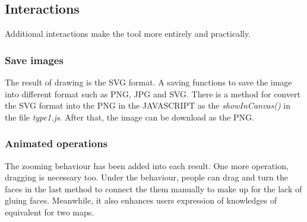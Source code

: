 \subsection{Interactions}

Additional interactions make the tool more entirely and practically.

\subsubsection{Save images}
The result of drawing is the SVG format. A saving functions to save the image into different format such as PNG, JPG and SVG. There is a method for convert the SVG format into the PNG in the JAVASCRIPT as the \textit{showInCanvas()} in the file \textit{type1.js}.  After that, the image can be download as the PNG.

\subsubsection{Animated operations}
The  zooming behaviour has been added into each result. One more operation, dragging is necessary too. Under the behaviour, people can drag and turn the faces in the last method to connect the them manually to make up for the lack of gluing faces. Meanwhile, it also enhances users expression of knowledges of equivalent for two maps.